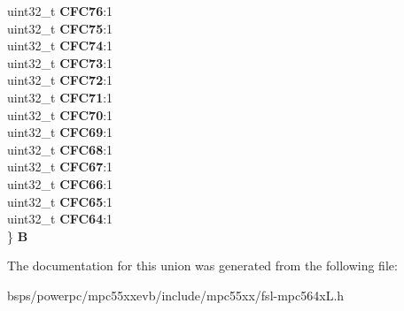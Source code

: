 \begin{DoxyCompactItemize}
\begin{tabbing}
\>uint32\_t {\bfseries CFC76}:1\\
\>uint32\_t {\bfseries CFC75}:1\\
\>uint32\_t {\bfseries CFC74}:1\\
\>uint32\_t {\bfseries CFC73}:1\\
\>uint32\_t {\bfseries CFC72}:1\\
\>uint32\_t {\bfseries CFC71}:1\\
\>uint32\_t {\bfseries CFC70}:1\\
\>uint32\_t {\bfseries CFC69}:1\\
\>uint32\_t {\bfseries CFC68}:1\\
\>uint32\_t {\bfseries CFC67}:1\\
\>uint32\_t {\bfseries CFC66}:1\\
\>uint32\_t {\bfseries CFC65}:1\\
\>uint32\_t {\bfseries CFC64}:1\\
\} {\bfseries B}\\

\end{tabbing}\end{DoxyCompactItemize}


The documentation for this union was generated from the following file\+:\begin{DoxyCompactItemize}
\item 
bsps/powerpc/mpc55xxevb/include/mpc55xx/fsl-\/mpc564x\+L.\+h\end{DoxyCompactItemize}
